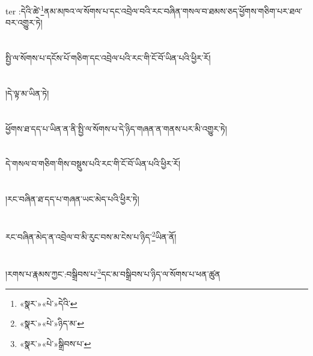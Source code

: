 ter{ }:དེའི་ཚེ་\footnote{«སྣར་»«པེ་»དེའི་}ནམ་མཁའ་ལ་སོགས་པ་དང་འབྲེལ་བའི་རང་བཞིན་གསལ་བ་ཐམས་ཅད་ཕྱོགས་གཅིག་པར་ཐལ་བར་འགྱུར་ཏེ།\chapter{ }སྤྱི་ལ་སོགས་པ་དངོས་པོ་གཅིག་དང་འབྲེལ་པའི་རང་གི་ངོ་བོ་ཡིན་པའི་ཕྱིར་རོ།\chapter{ }།དེ་ལྟ་མ་ཡིན་ཏེ།\chapter{ }ཕྱོགས་ཐ་དད་པ་ཡིན་ན་ནི་སྤྱི་ལ་སོགས་པ་དེ་ཉིད་གཞན་ན་གནས་པར་མི་འགྱུར་ཏེ།\chapter{ }དེ་གསལ་བ་གཅིག་གིས་བསྡུས་པའི་རང་གི་ངོ་བོ་ཡིན་པའི་ཕྱིར་རོ།\chapter{ }།རང་བཞིན་ཐ་དད་པ་གཞན་ཡང་མེད་པའི་ཕྱིར་ཏེ།\chapter{ }རང་བཞིན་མེད་ན་འབྲེལ་བ་མི་རུང་བས་མ་ངེས་པ་ཉིད་\footnote{«སྣར་»«པེ་»ཉིད་མ་}ཡིན་ནོ།\chapter{ }།རགས་པ་རྣམས་ཀྱང་:བསྒྲིབས་པ་\footnote{«སྣར་»«པེ་»སྒྲིབས་པ་}དང་མ་བསྒྲིབས་པ་ཉིད་ལ་སོགས་པ་ཕན་ཚུན